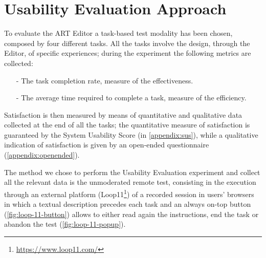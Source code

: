 \section{Usability Evaluation Approach}
\label{sec:evaluation-approach}

To evaluate the ART Editor a task-based test modality has been chosen, composed by four different tasks. All the tasks involve the design, through the Editor, of specific experiences; during the experiment the following metrics are collected:
\begin{itemize}
    \item[-]The task completion rate, measure of the effectiveness.
    \item[-]The average time required to complete a task, measure of the efficiency.
\end{itemize}

Satisfaction is then measured by means of quantitative and qualitative data collected at the end of all the tasks; the quantitative measure of satisfaction is guaranteed by the System Usability Score \cite{brooke_sus_1996} (in \autoref{appendix:sus}), while a qualitative indication of satisfaction is given by an open-ended questionnaire (\autoref{appendix:openended}).

The method we chose to perform the Usability Evaluation experiment and collect all the relevant data is the unmoderated remote test, consisting in the execution through an external platform (Loop11\footnote{\url{https://www.loop11.com/}}) of a recorded session in users' browsers in which a textual description precedes each task and an always on-top button (\autoref{fig:loop-11-button}) allows to either read again the instructions, end the task or abandon the test (\autoref{fig:loop-11-popup}).

